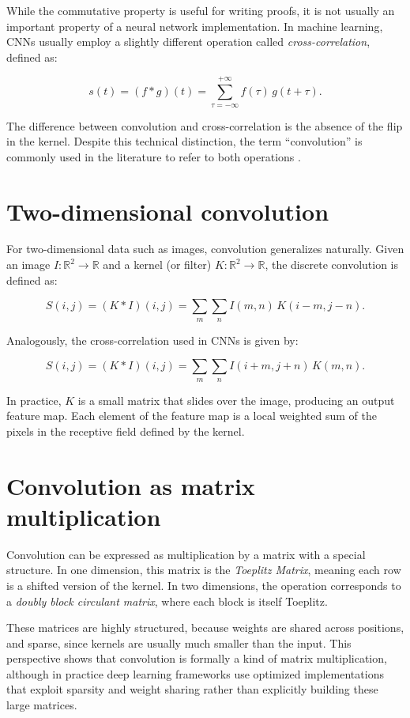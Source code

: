 While the commutative property is useful for writing proofs, it is not usually an important property of a neural network implementation. In machine learning, CNNs usually employ a slightly different operation called \textit{cross-correlation}, defined as:

\begin{equation}
s(t)=(f * g)(t) = \sum_{\tau=-\infty}^{+\infty} f(\tau) \, g(t + \tau).
\end{equation}

The difference between convolution and cross-correlation is the absence of the flip in the kernel. Despite this technical distinction, the term “convolution” is commonly used in the literature to refer to both operations \cite{goodfellow2016deep}.

\section{Two-dimensional convolution}

For two-dimensional data such as images, convolution generalizes naturally.  
Given an image $I : \mathbb{R}^2 \to \mathbb{R}$ and a kernel (or filter) $K : \mathbb{R}^2 \to \mathbb{R}$, the discrete convolution is defined as:

\begin{equation}
S(i,j)=(K*I)(i, j) = \sum_{m} \sum_{n} I(m, n) \, K(i - m, j - n).
\end{equation}

Analogously, the cross-correlation used in CNNs is given by:

\begin{equation}
S(i,j)=(K*I)(i, j) = \sum_{m} \sum_{n} I(i + m, j + n) \, K(m, n).
\end{equation}

In practice, $K$ is a small matrix that slides over the image, producing an output feature map.  
Each element of the feature map is a local weighted sum of the pixels in the receptive field defined by the kernel.  

\section{Convolution as matrix multiplication}

Convolution can be expressed as multiplication by a matrix with a special structure.  
In one dimension, this matrix is the \textit{Toeplitz Matrix}, meaning each row is a shifted version of the kernel. In two dimensions, the operation corresponds to a \textit{doubly block circulant matrix}, where each block is itself Toeplitz.  

These matrices are highly structured, because weights are shared across positions, and sparse, since kernels are usually much smaller than the input. This perspective shows that convolution is formally a kind of matrix multiplication, although in practice deep learning frameworks use optimized implementations that exploit sparsity and weight sharing rather than explicitly building these large matrices.  